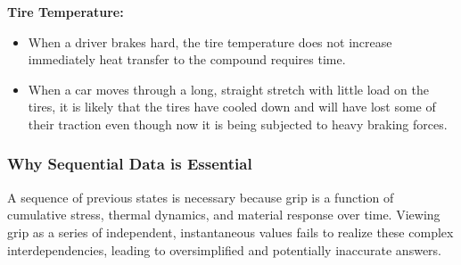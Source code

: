 \documentclass[a4paper,final,12pt]{report}
\begin{document}
\textbf{Tire Temperature:}
\begin{itemize}
    \item When a driver brakes hard, the tire temperature does not increase immediately heat transfer to the compound requires time.
    \item When a car moves through a long, straight stretch with little load on the tires, it is likely that the tires have cooled down and will have lost some of their traction even though now it is being subjected to heavy braking forces.
\end{itemize}


\subsubsection{Why Sequential Data is Essential}
A sequence of previous states is necessary because grip is a function of cumulative stress, thermal dynamics, and material response over time. Viewing grip as a series of independent, instantaneous values fails to realize these complex interdependencies, leading to oversimplified and potentially inaccurate answers.
\newpage
\end{document}
